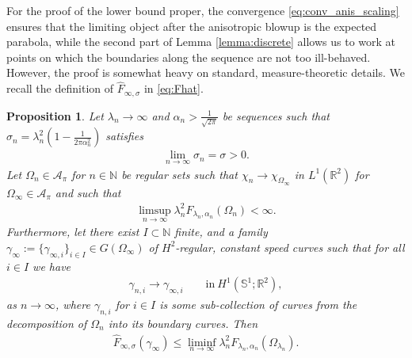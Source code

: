 \documentclass[11pt]{article}
\newcounter{statement}
\numberwithin{statement}{section}
\numberwithin{equation}{section}
\newtheorem{prop}[statement]{Proposition}
\theoremstyle{remark}
\newcommand{\R}{\mathbb R} 				%
\newcommand{\N}{\mathbb N}
\newcommand{\Sph}{{\mathbb S}}				%
\begin{document}
For the proof of the lower bound proper, the convergence
\eqref{eq:conv_anis_scaling} ensures that the limiting object after
the anisotropic blowup is the expected parabola, while the second part
of Lemma \ref{lemma:discrete} allows us to work at points on which the
boundaries along the sequence are not too ill-behaved.  However, the
proof is somewhat heavy on standard, measure-theoretic
details. We recall the definition of $\hat F_{\infty,\sigma}$ in
  \eqref{eq:Fhat}.


\begin{prop}\label{prop:lower_bound}
  Let $\lambda_n \to \infty$ and $\alpha_n >\frac{1}{\sqrt{2\pi}}$ be
  sequences such that
  $\sigma_n = \lambda_n^2 \left( 1- \frac{1}{2\pi \alpha_n^2} \right)$
  satisfies
	\begin{align}
		\lim_{n\to \infty} \sigma_n = \sigma >0.
	\end{align}
	Let $\Omega_{n} \in \mathcal{A}_\pi$ for $n\in \N$ be
        regular sets such that
        $\chi_{n} \to \chi_{\Omega_\infty}$ in $L^1(\R^2)$ for
        $\Omega_\infty \in \mathcal{A}_\pi$ and such that 
	\begin{align}\label{eq:lower_bound_boundedness}
          \limsup_{n \to \infty} \lambda_n^2 F_{\lambda_n,
          \alpha_n} (\Omega_{n}) <\infty. 
	\end{align}
	Furthermore, let there exist $I \subset \N$ finite, and a
        family
        $\gamma_\infty := \{\gamma_{\infty,i}\}_{i\in I} \in
        G(\Omega_\infty)$ of $H^2$-regular, constant speed curves such
        that for all $i\in I$ we have
	\begin{align}
		\gamma_{n,i} \to \gamma_{\infty,i} \qquad \text{in} \
          H^1(\Sph^1; \R^2),
	\end{align}
        as $n \to \infty$, where $\gamma_{n,i}$ for $i \in I$ is some
      sub-collection of curves from the decomposition of $\Omega_{n}$
      into its boundary curves. Then 
	\begin{align}
		\hat F_{\infty,\sigma}(\gamma_\infty)  \leq \liminf_{n
          \to \infty} \lambda_n^2 F_{\lambda_n,\alpha_n} (\Omega_{\lambda_n}). 
	\end{align}
\end{prop}
\end{document}
